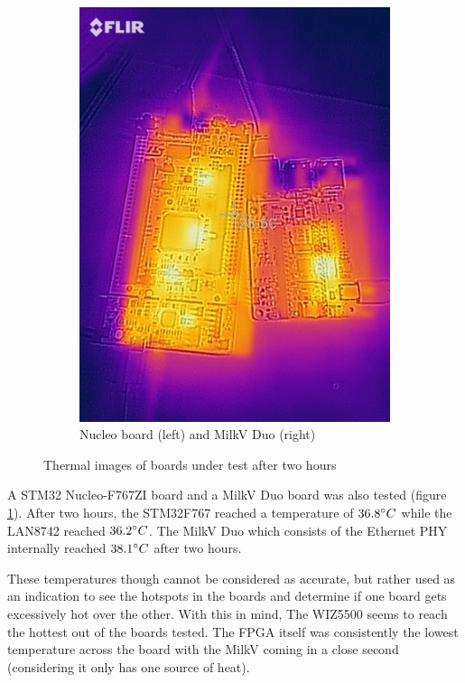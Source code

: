 \begin{figure}[h]
\begin{subfigure}[b]{0.45\textwidth}
        \includegraphics[width=\textwidth]{Images/flir_nucleo_milkv.jpg}
        \caption{Nucleo board (left) and MilkV Duo (right)}
        \label{fig:thermal_2hr_nucleo_milkv}
    \end{subfigure}
    \caption{Thermal images of boards under test after two hours}
    \label{fig:thermal_2hr}
\end{figure}

A STM32 Nucleo-F767ZI board and a MilkV Duo board was also tested (figure \ref{fig:thermal_2hr_nucleo_milkv}). After two hours, the STM32F767 reached a temperature of $36.8\degree C$ while the LAN8742 reached $36.2\degree C$. The MilkV Duo which consists of the Ethernet PHY internally reached $38.1\degree C$ after two hours.

These temperatures though cannot be considered as accurate, but rather used as an indication to see the hotspots in the boards and determine if one board gets excessively hot over the other. With this in mind, The WIZ5500 seems to reach the hottest out of the boards tested. The FPGA itself was consistently the lowest temperature across the board with the MilkV coming in a close second (considering it only has one source of heat).


